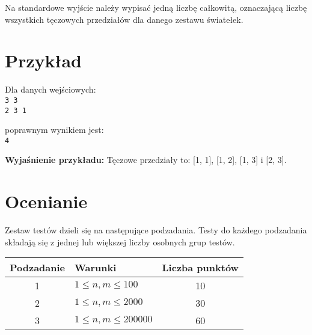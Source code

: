 \documentclass[10pt]{article}
\begin{document}
    Na standardowe wyjście należy wypisać jedną liczbę całkowitą, oznaczającą liczbę wszystkich tęczowych przedziałów dla danego zestawu światełek.


    \section*{Przykład}
    
    \noindent
    \begin{minipage}[t]{0.5\textwidth}
        Dla danych wejściowych:\vspace{1ex}\\
        \texttt{3 3\\2 3 1}
    \end{minipage}
    \begin{minipage}[t]{0.5\textwidth}
        poprawnym wynikiem jest:\vspace{1ex}\\
        \texttt{4}
    \end{minipage}
    
    \vspace{2ex}
    \noindent\textbf{Wyjaśnienie przykładu:} Tęczowe przedziały to: [1, 1], [1, 2], [1, 3] i [2, 3]. 
    
    
    

    \section*{Ocenianie}
        
    Zestaw testów dzieli się na następujące podzadania. Testy do każdego podzadania składają się z jednej lub większej liczby osobnych grup testów.
    
    \begin{center}
        \begin{tabular}{ |c|p{9cm}|c| }
            \hline
            \textbf{Podzadanie} & \textbf{Warunki} & \textbf{Liczba punktów}\\
            \hline
            1 & $1 \leq n, m \leq 100$ & 10\\
            \hline
            2 & $1 \leq n, m \leq 2000$ & 30\\
            \hline
            3 & $1 \leq n, m \leq 200000$ & 60\\
            \hline
            
        \end{tabular}
    \end{center}
\end{document}
